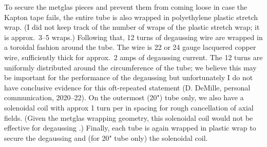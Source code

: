 To secure the metglas pieces and prevent them from coming loose in case the
Kapton tape fails, the entire tube is also wrapped in polyethylene plastic
stretch wrap. (I did not keep track of the number of wraps of the plastic
stretch wrap; it is approx.\ 3--5 wraps.) Following that, 12 turns of degaussing
wire are wrapped in a toroidal fashion around the tube. The wire is 22 or 24
gauge lacquered copper wire, sufficiently thick for approx.\ 2 amps of
degaussing current. The 12 turns are uniformly distributed around the
circumference of the tube; we believe this may be important for the performance
of the degaussing but unfortunately I do not have conclusive evidence for this
oft-repeated statement (D. DeMille, personal communication, 2020--22). On the
outermost (20") tube only, we also have a solenoidal coil with approx 1 turn per
in spacing for rough cancellation of axial fields. (Given the metglas wrapping
geometry, this solenoidal coil would not be effective for degaussing
\cite{malkowski2011technique}.) Finally, each tube is again wrapped in plastic
wrap to secure the degaussing and (for 20" tube only) the solenoidal coil.

